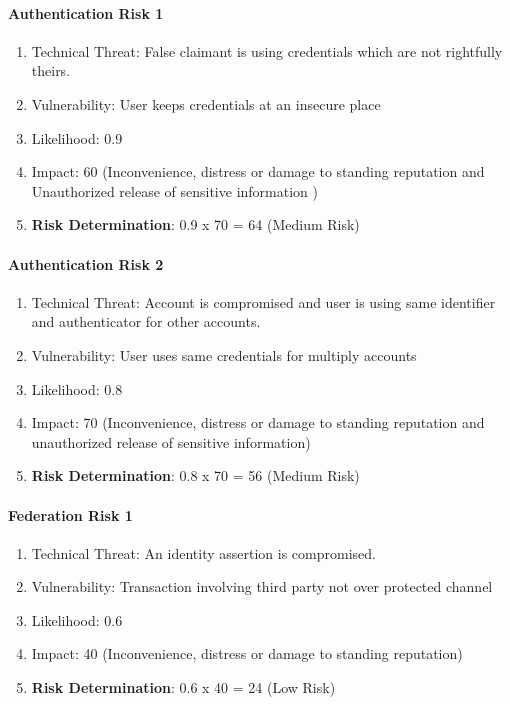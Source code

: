 \paragraph{Authentication Risk 1}
\begin{enumerate}
	\item Technical Threat: False claimant is using credentials which are not rightfully theirs.
	\item Vulnerability: User keeps credentials at an insecure place
	\item Likelihood: 0.9
	\item Impact: 60 (Inconvenience, distress or damage to standing reputation and Unauthorized release of sensitive information )
	\item \textbf{Risk Determination}: 0.9 x 70 = 64 (Medium Risk) 
\end{enumerate}

\paragraph{Authentication Risk 2}
\begin{enumerate}
	\item Technical Threat: Account is compromised and user is using same identifier and authenticator for other accounts.
	\item Vulnerability: User uses same credentials for multiply accounts
	\item Likelihood: 0.8
	\item Impact: 70 (Inconvenience, distress or damage to standing reputation and unauthorized release of sensitive information)
	\item \textbf{Risk Determination}: 0.8 x 70 = 56 (Medium Risk)
\end{enumerate}
\pagebreak[4]
\paragraph{Federation Risk 1 }
\begin{enumerate}
	\item Technical Threat: An identity assertion is compromised.
	\item Vulnerability: Transaction involving third party not over protected channel
	\item Likelihood: 0.6
	\item Impact: 40 (Inconvenience, distress or damage to standing reputation)
	\item \textbf{Risk Determination}: 0.6 x 40 = 24 (Low Risk)
\end{enumerate}

